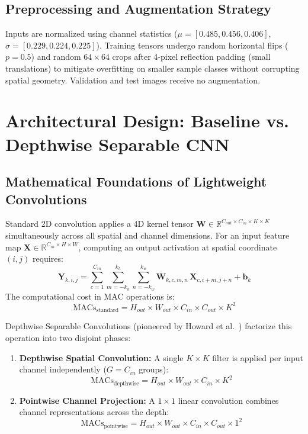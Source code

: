 \documentclass[11pt,a4paper]{article}
\begin{document}
\subsection{Preprocessing and Augmentation Strategy}
Inputs are normalized using channel statistics ($\mu = [0.485, 0.456, 0.406]$, $\sigma = [0.229, 0.224, 0.225]$). Training tensors undergo random horizontal flips ($p=0.5$) and random $64 \times 64$ crops after 4-pixel reflection padding (small translations) to mitigate overfitting on smaller sample classes without corrupting spatial geometry. Validation and test images receive no augmentation.

\section{Architectural Design: Baseline vs. Depthwise Separable CNN}
\label{sec:architectures}

\subsection{Mathematical Foundations of Lightweight Convolutions}
Standard 2D convolution applies a 4D kernel tensor $\mathbf{W} \in \mathbb{R}^{C_{out} \times C_{in} \times K \times K}$ simultaneously across all spatial and channel dimensions. For an input feature map $\mathbf{X} \in \mathbb{R}^{C_{in} \times H \times W}$, computing an output activation at spatial coordinate $(i, j)$ requires:
\begin{equation}
  \mathbf{Y}_{k, i, j} = \sum_{c=1}^{C_{in}} \sum_{m=-k_h}^{k_h} \sum_{n=-k_w}^{k_w} \mathbf{W}_{k, c, m, n} \, \mathbf{X}_{c, i+m, j+n} + \mathbf{b}_k
\end{equation}
The computational cost in MAC operations is:
\begin{equation}
  \text{MACs}_{\text{standard}} = H_{out} \times W_{out} \times C_{in} \times C_{out} \times K^2
\end{equation}

Depthwise Separable Convolutions (pioneered by Howard et al.~\cite{mobilenets}) factorize this operation into two disjoint phases:
\begin{enumerate}[leftmargin=*,itemsep=1pt]
  \item \textbf{Depthwise Spatial Convolution:} A single $K \times K$ filter is applied per input channel independently ($G = C_{in}$ groups):
  \begin{equation}
    \text{MACs}_{\text{depthwise}} = H_{out} \times W_{out} \times C_{in} \times K^2
  \end{equation}
  \item \textbf{Pointwise Channel Projection:} A $1 \times 1$ linear convolution combines channel representations across the depth:
  \begin{equation}
    \text{MACs}_{\text{pointwise}} = H_{out} \times W_{out} \times C_{in} \times C_{out} \times 1^2
  \end{equation}
\end{enumerate}
\end{document}
